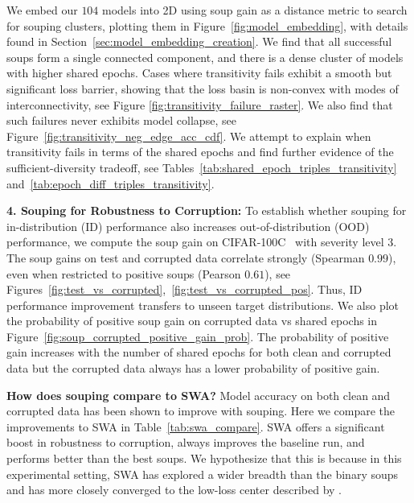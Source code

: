 We embed our $104$ models into 2D using soup gain as a distance metric to search for souping clusters, plotting them in Figure~\ref{fig:model_embedding}, with details found in Section~\ref{sec:model_embedding_creation}. We find that all successful soups form a single connected component, and there is a dense cluster of models with higher shared epochs. 
Cases where transitivity fails exhibit a smooth but significant loss barrier, showing that the loss basin is non-convex with modes of interconnectivity, see Figure \ref{fig:transitivity_failure_raster}. We also find that such failures never exhibits model collapse, see Figure~\ref{fig:transitivity_neg_edge_acc_cdf}. We attempt to explain when transitivity fails in terms of the shared epochs and find further evidence of the sufficient-diversity tradeoff, see Tables~\ref{tab:shared_epoch_triples_transitivity} and~\ref{tab:epoch_diff_triples_transitivity}. 



\textbf{4. Souping for Robustness to Corruption:} To establish whether souping for in-distribution (ID) performance also increases out-of-distribution (OOD) performance, we compute the soup gain on CIFAR-100C~\citep{cifar100c} with severity level 3. The soup gains on test and corrupted data correlate strongly (Spearman $0.99$), even when restricted to positive soups (Pearson $0.61$), see Figures~\ref{fig:test_vs_corrupted},~\ref{fig:test_vs_corrupted_pos}. Thus, ID performance improvement transfers to unseen target distributions. We also plot the probability of positive soup gain on corrupted data vs shared epochs in Figure~\ref{fig:soup_corrupted_positive_gain_prob}. The probability of positive gain increases with the number of shared epochs for both clean and corrupted data but the corrupted data always has a lower probability of positive gain.

\textbf{How does souping compare to SWA?} Model accuracy on both clean and corrupted data has been shown to improve with souping. 
Here we compare the improvements to SWA in Table~\ref{tab:swa_compare}. SWA offers a significant boost in robustness to corruption, always improves the baseline run, and performs better than the best soups. We hypothesize that this is because in this experimental setting, SWA has explored a wider breadth than the binary soups and has more closely converged to the low-loss center described by \citet{modelstock}.

